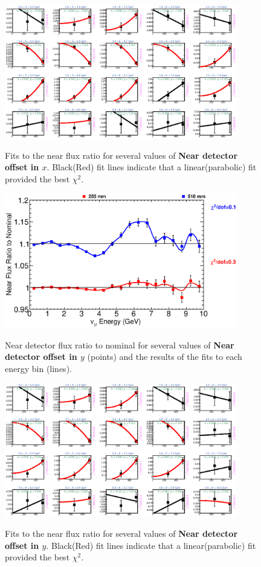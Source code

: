 \begin{figure}[hb]
  \begin{center}
    {\includegraphics[width=4.0in]{figures/LBNENDX_near_fits.eps}}
  \end{center}
\caption{ Fits to the near flux ratio for several values of {\bf Near detector offset in $x$}. Black(Red) fit lines indicate that a linear(parabolic) fit provided the best $\chi^2$. }
\end{figure}

\begin{figure}[ht]
  \begin{center}
    {\includegraphics[width=4.0in]{figures/LBNENDY_near_summary.eps}}
  \end{center}
\caption{ Near detector flux ratio to nominal for several values of {\bf Near detector offset in $y$} (points) and the results of the fits to each energy bin (lines).}
\end{figure}

\begin{figure}[hb]
  \begin{center}
    {\includegraphics[width=4.0in]{figures/LBNENDY_near_fits.eps}}
  \end{center}
\caption{ Fits to the near flux ratio for several values of {\bf Near detector offset in $y$}. Black(Red) fit lines indicate that a linear(parabolic) fit provided the best $\chi^2$. }
\end{figure}


